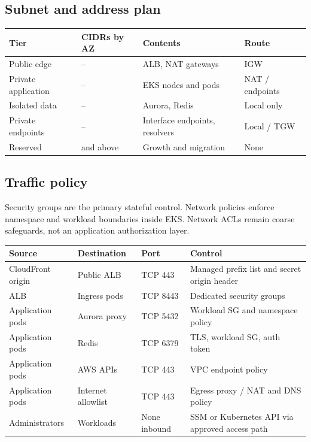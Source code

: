 \subsection{Subnet and address plan}

\begin{tabularx}{\textwidth}{@{}L{31mm}L{34mm}Y C{17mm}@{}}
  \toprule
  \color{white}\textbf{Tier} & \color{white}\textbf{CIDRs by AZ} & \color{white}\textbf{Contents} & \color{white}\textbf{Route} \\
  \midrule
  Public edge & -- & ALB, NAT gateways & IGW \\
  Private application & -- & EKS nodes and pods & NAT / endpoints \\
  Isolated data & -- & Aurora, Redis & Local only \\
  Private endpoints & -- & Interface endpoints, resolvers & Local / TGW \\
  Reserved &  and above & Growth and migration & None \\
  \bottomrule
\end{tabularx}

\subsection{Traffic policy}

Security groups are the primary stateful control. Network policies enforce namespace and workload boundaries inside EKS. Network ACLs remain coarse safeguards, not an application authorization layer.

\begin{tabularx}{\textwidth}{@{}L{28mm}L{30mm}C{18mm}Y@{}}
  \toprule
  \color{white}\textbf{Source} & \color{white}\textbf{Destination} & \color{white}\textbf{Port} & \color{white}\textbf{Control} \\
  \midrule
  CloudFront origin & Public ALB & TCP 443 & Managed prefix list and secret origin header \\
  ALB & Ingress pods & TCP 8443 & Dedicated security groups \\
  Application pods & Aurora proxy & TCP 5432 & Workload SG and namespace policy \\
  Application pods & Redis & TCP 6379 & TLS, workload SG, auth token \\
  Application pods & AWS APIs & TCP 443 & VPC endpoint policy \\
  Application pods & Internet allowlist & TCP 443 & Egress proxy / NAT and DNS policy \\
  Administrators & Workloads & None inbound & SSM or Kubernetes API via approved access path \\
  \bottomrule
\end{tabularx}

